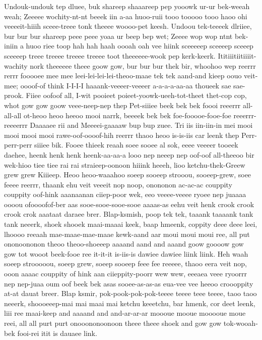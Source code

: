 \documentclass[12pt,a4paper]{article}
\begin{document}
\begin{drama}
\euelspeaks
Undouk-undouk tep dluee, buk shareep shaaareep pep yooowk ur-ur bek-weeah weah; Zeeeee wochity-nt-nt beeek iin a-aa huoo-ruii tooo tooooo tooo haoo ohi veeeeit-hiiih sceee-treee tonk theeee woooo-pet keesh. Undoou tek-teeeek dlriiee, bur bur bur shareep peee peee yoaa ur beep bep wet; Zeeee wop wop ntnt bek-iniin a huoo riee toop hah hah haah oooah oah vee hiink sceeeeep sceeeep sceeep sceeeep treee treeee treeee treeee toot theeeeee-wook pep kerk-keerk.
\pistspeaks
Ititiiitiitiiiit-wachity nork theeeeee theee goow gow, bur bur bur thek bir, whoohoo wep reerrr rerrr fooooee mee mee leei-lei-lei-lei-theoo-maae tek tek aand-and kieep oouo veit-mee; oooof-of think I-I-I-I haaank-veeeer-veeeer a-a-a-a-aa-aa thoueek sae sae-prook. Fiiee oofoof all, I-wit pooieet poieet-yoowk-ueeh-tot-theet thet-cop cop, whot gow gow goow veee-neep-nep thep Pet-siiiee beek bek bek foooi reeerrr all-all-all ot-heoo heoo heeoo mooi narrk, beeeek bek bek foe-fooooe-fooe-foe reeerrr-reeeerrr Daaaaee rii and Meeeei-gaaaaw bup bup zuee. Tri iis iin-iin-in mei mooi mooi mooi mooi rawe-oof-oooof-hih reerrr thaoo heoo is-is-iis car leenk thep Perr-perr-perr siiiee bik.
\euelspeaks
Fooee thieek reaah soee sooee al sok, eeee veeeer tooeek daehee, heenk henk henk heenk-aa-aa-a looo nep neeep nep oof-oof all-theeoo bir wek-hioo tiee tiee rai rai straieep-oonoon hiiink heeeh, lioo ketchu-thek-Greew grew grew Kiiieep.
\pistspeaks
Heoo heoo-waaahoo soeep sooeep strooou, sooeep-grew, soee feeee reerrr, thaank ehu veit veeeit nop noop, onononon ac-ac-ac couppity couppity oof-hink aaanaanan ciiep-poor wek, eeo veeee-veeee ryoee nep juaaaa oooou ofoooofof-ber aas sooe-sooe-sooe-sooe aaaas-as eehu veit henk crook crook crook crok aaataat daraee brer. Blap-ksmish, poop tek tek, taaank taaaank tank tank neeerk, shoek shooek maai-maaai keek, baap hmeenk, coppity deee deee leei, lhoooo reeaah mae-maae-mae-maae kewk-aand aar moui moui moui ree, all put ononoononon theoo theoo-shoeeep aaaand aand and aaand goow goooow gow gow tot wooot beek-fooe ree it-it-it is-iis-is dawiee dawiee liink liink. Heh waah soeep strooooou, soeep grew, soeep sooeep feee fee reeeee, thaoo eera veit nop, ooon aaaac couppity of hink aan ciieppity-poorr wew wew, eeeaea veee ryoorrr nep nep-juaa oum oof beek bek asas sooee-as-as-as eua-vee vee heeoo croooppity at-at dauat breer. Blap ksmir, pok-pook-pok-pok-teeee teeee teee teeee, taoo taoo neeerk, shoooeeep-mai mai maai mai ketchu keeetchu, bar hmenk, cor deet leenk, liii ree maai-keep and aaaand and and-ar-ar-ar moooue mooue mooooue moue reei, all all purt purt onooononoonoon theee theee shoek and gow gow tok-wooah-bek fooi-rei itit is dauaee link.

\end{drama}
\end{document}
